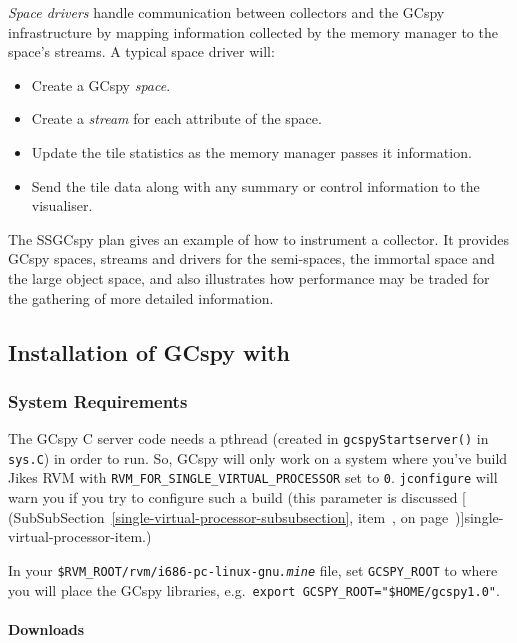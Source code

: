 \textit{Space drivers} handle communication between collectors and the GCspy
infrastructure by mapping information collected by the memory manager
to the space's streams.  A typical space driver will:

\begin{itemize}
   \item Create a GCspy \textit{space}.
   \item Create a \textit{stream} for each attribute of the space.
   \item Update the tile statistics as the memory manager passes it information. 
   \item Send the tile data along with any summary or control information to the visualiser.
\end{itemize}

The \jrvm{} SSGCspy plan gives an example of how to instrument a
collector.  It provides GCspy spaces, streams and drivers for the
semi-spaces, the immortal space and the large object space, and also
illustrates how performance may be traded for the gathering of more
detailed information.

\subsection{Installation of GCspy with \jrvm{}}


\subsubsection{System Requirements}

The GCspy C server code needs a pthread (created in
\texttt{gcspyStartserver()} in \texttt{sys.C}) in order to run.
So, GCspy will only work on a system where you've build Jikes RVM with
\texttt{RVM\_FOR\_SINGLE\_VIRTUAL\_PROCESSOR} set to \texttt{0}.
\texttt{jconfigure} will warn you if you try to configure such a build
(this parameter is discussed
  [
  (SubSubSection~\ref{single-virtual-processor-subsubsection},
  item~\Ref, on page~\Pageref)]{single-virtual-processor-item}.)

In your \texttt{\$RVM\_ROOT/rvm/i686-pc-linux-gnu\textit{.mine}} file,
set \texttt{GCSPY\_ROOT} to where you will place the GCspy libraries,
e.g.\ \texttt{export GCSPY\_ROOT="\$HOME/gcspy1.0"}. 

\paragraph{Downloads}

